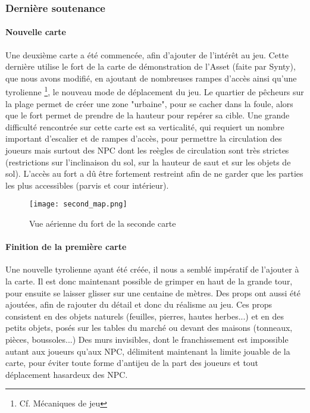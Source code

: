 \subsubsection{Dernière soutenance}

    \paragraph{Nouvelle carte}

    Une deuxième carte a été commencée, afin d'ajouter de l'intérêt au jeu. Cette dernière utilise le fort de la carte 
    de démonstration de l'Asset (faite par Synty), que nous avons modifié, en ajoutant de nombreuses rampes d'accès ainsi qu'une tyrolienne \footnote{Cf. Mécaniques de jeu}, 
    le nouveau mode de déplacement du jeu. Le quartier de pêcheurs sur la plage permet de créer une zone "urbaine", pour se 
    cacher dans la foule, alors que le fort permet de prendre de la hauteur pour repérer sa cible. Une grande difficulté rencontrée sur 
    cette carte est sa verticalité, qui requiert un nombre important d'escalier et de rampes d'accès, pour permettre la 
    circulation des joueurs mais surtout des NPC dont les reègles de circulation sont très strictes (restrictions sur l'inclinaison 
    du sol, sur la hauteur de saut et sur les objets de sol). L'accès au fort a dû être fortement restreint afin de ne garder 
    que les parties les plus accessibles (parvis et cour intérieur).

    \begin{figure}[hbt!]
        \centering
        \texttt{[image: second\_map.png]}
        \caption{Vue aérienne du fort de la seconde carte}
    \end{figure}
    \FloatBarrier


    \paragraph{Finition de la première carte}

    Une nouvelle tyrolienne ayant été créée, il nous a semblé impératif de l'ajouter à la carte. Il est donc maintenant possible 
    de grimper en haut de la grande tour, pour ensuite se laisser glisser sur une centaine de mètres. Des props ont aussi 
    été ajoutées, afin de rajouter du détail et donc du réalisme au jeu. Ces props consistent en des objets naturels (feuilles, pierres, 
    hautes herbes...) et en des petits objets, posés sur les tables du marché ou devant des maisons (tonneaux, pièces, boussoles...)
    Des murs invisibles, dont le franchissement est impossible autant aux joueurs qu'aux NPC, délimitent maintenant la limite 
    jouable de la carte, pour éviter toute forme d'antijeu de la part des joueurs et tout déplacement hasardeux des NPC.
    


